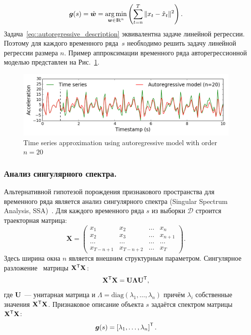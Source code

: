 \documentclass{llncs}
\DeclareMathOperator*{\argmin}{arg\,min}
\newcommand{\T}{{\mbox{\scriptsize\sffamily\upshape\mdseries T}}}
\begin{document}
\begin{equation}
\bm{g}(s) = \hat{\bm{w}} = \argmin_{\bm{w} \in \bbbr^{n}} \left( \sum_{t=n}^{T} \|x_t - \hat{x}_t\|^2\right).
\label{eq::autoregressive_description}
\end{equation}
Задача~\eqref{eq::autoregressive_description} эквивалентна задаче линейной регрессии.
Поэтому для каждого временного ряда~$s$ необходимо решить задачу линейной регрессии размера $n$.
Пример аппроксимации временного ряда авторегрессионной моделью представлен на Рис.~\ref{fig::ar_example}.

\begin{figure}[h]
	\centering
	\includegraphics[width=1\linewidth]{pics/ar_example.png}
	\caption{Time series approximation using autoregressive model with order $n = 20$}
	\label{fig::ar_example}
\end{figure}

\subsubsection{Анализ сингулярного спектра.}
Альтернативной гипотезой порождения признакового пространства для временного ряда является анализ сингулярного спектра (Singular Spectrum Analysis, SSA)~\cite{hassani2007singular}. 
Для каждого временного ряда $s$ из выборки $\mathcal{D}$ строится траекторная матрица:
\[
\mathbf{X} = 
\begin{pmatrix}
x_1 & x_2 & \dots & x_n \\
x_2 & x_3 & \dots & x_{n+1} \\
\dots & \dots & \dots & \dots \\
x_{T-n+1} & x_{T-n+2} & \dots & x_T
\end{pmatrix}.
\]
Здесь ширина окна $n$ является внешним структурным параметром.
Сингулярное разложение~\cite{golub1970singular} матрицы $\mathbf{X}^{\T} \mathbf{X}$:
\[
\mathbf{X}^{\T} \mathbf{X} = \mathbf{U} \mathbf{\Lambda} \mathbf{U}^{\T},
\]
где $\mathbf{U}$~--- унитарная матрица и $\Lambda = \mathrm{diag}(\lambda_1, \dots, \lambda_n)$ причём $\lambda_i$ собственные значения $\mathbf{X}^{\T} \mathbf{X}$. 
Признаковое описание объекта $s$ задаётся спектром матрицы $\mathbf{X}^{\T} \mathbf{X}$:
\[
\bm{g}(s) = \left[\lambda_1, \dots, \lambda_n\right]^{\T}.
\]
\end{document}
